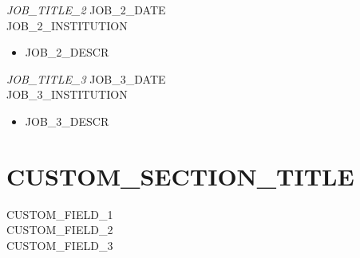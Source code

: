 \documentclass[margin, 10pt]{res} %
\begin{document}
\begin{resume}
{\sl JOB_TITLE_2} \hfill JOB_2_DATE \\
JOB_2_INSTITUTION
\begin{itemize} 
\item JOB_2_DESCR 
\end{itemize} 

{\sl JOB_TITLE_3} \hfill JOB_3_DATE \\
JOB_3_INSTITUTION
\begin{itemize}
\item JOB_3_DESCR 
\end{itemize} 


\section{CUSTOM_SECTION_TITLE} 

CUSTOM_FIELD_1 \\
CUSTOM_FIELD_2 \\
CUSTOM_FIELD_3


\end{resume}
\end{document}
